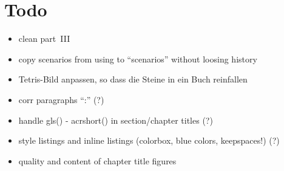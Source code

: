 \section*{Todo}

\begin{itemize}\styleItemize

\item clean part~III

\item copy scenarios from using to ``scenarios'' without loosing history

\item Tetris-Bild anpassen, so dass die Steine in ein Buch reinfallen

\item corr paragraphs ``:'' (?)

\item handle gls() - acrshort() in section/chapter titles (?)

\item style listings and inline listings (colorbox, blue colors, keepspaces!) (?)

\item quality and content of chapter title figures









\end{itemize}